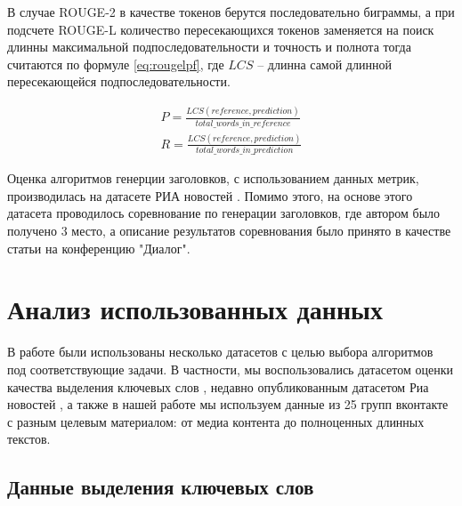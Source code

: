 \documentclass[14pt]{matmex-diploma-custom}
\begin{document}
В случае ROUGE-2 в качестве токенов берутся последовательно биграммы, а при подсчете ROUGE-L количество пересекающихся токенов заменяется на поиск длинны максимальной подпоследовательности и точность и полнота тогда считаются по формуле \ref{eq:rougelpf}, где $LCS$ -- длинна самой длинной пересекающейся подпоследовательности.

\begin{equation}\label{eq:rougelpf}
\begin{gathered}
P = \frac{LCS(reference, prediction)}{total\_words\_in\_reference} \\ 
R = \frac{LCS(reference, prediction)}{total\_words\_in\_prediction}
\end{gathered}
\end{equation}

Оценка алгоритмов генерции заголовков, с использованием данных метрик, производилась на датасете 
РИА новостей \cite{gavrilov2018self}. Помимо этого,
на основе этого датасета проводилось соревнование по генерации заголовков, где автором было
получено 3 место, а описание результатов соревнования было принято в качестве статьи на конференцию "Диалог".



\section{Анализ использованных данных}

В работе были использованы несколько датасетов с целью выбора алгоритмов под соответствующие задачи.
В частности, мы воспользовались датасетом оценки качества выделения ключевых слов \cite{mannefedov2019}, недавно
опубликованным датасетом Риа новостей \cite{gavrilov2018self}, а также в нашей работе мы используем
данные из 25 групп вконтакте с разным целевым материалом: от медиа контента до полноценных длинных
текстов.

\subsection{Данные выделения ключевых слов}
\end{document}
